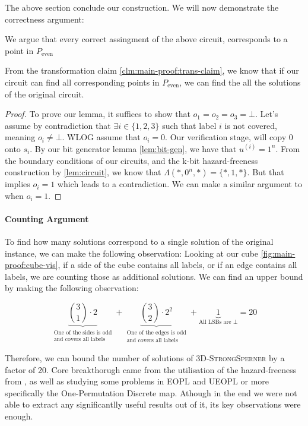The above section conclude our construction. We will now demonstrate the correctness argument:

\begin{lemma}
    We argue that every correct assingment of the above circuit, corresponds to a point in $P_{\text{even}}$
\end{lemma}
From the transformation claim \ref{clm:main-proof:trans-claim}, we know that if our circuit
can find all corresponding points in $P_{\text{even}}$, we can find the all the solutions of the original circuit.

\begin{proof}
    To prove our lemma, it suffices to show that $o_1 = o_2 = o_3 = \bot$. Let's assume by contradiction that
    $\exists i \in \{1,2,3\}$ such that label $i$ is not covered, meaning $o_i \neq \bot$.
    WLOG assume that $o_i = 0$. Our verification stage, will copy $0$ onto $s_i$. By our
    bit generator lemma \ref{lem:bit-gen}, we have that $u^{(i)} = 1^n$. From the boundary
    conditions of our circuits, and the k-bit hazard-freeness construction by
    \ref{lem:circuit}, we know that $\Lambda(*, 0^n, *) = \{*, 1,  *\}$. But that implies
    $o_i = 1$ which leads to a contradiction. We can make a similar argument to when $o_i = 1$.
\end{proof}

\paragraph*{Counting Argument}

To find how many solutions correspond to a single solution of the original instance,
we can make the following observation: Looking at our cube \ref{fig:main-proof:cube-vis},
if a side of the cube contains all labels, or if an edge contains all labels, we are counting
those as additional solutions. We can find an upper bound by making the following observation:

$$
\underbrace{\binom{3}{1} \cdot 2}_{\substack{\text{One of the sides is odd} \\ \text{and covers all labels}}}
+ \underbrace{\binom{3}{2} \cdot 2^2}_{\substack{\text{One of the edges is odd} \\ \text{and covers all labels}}}
+ \underbrace{1}_{\text{All LSBs are } \bot} = 20
$$

Therefore, we can bound the number of solutions of \textsc{3D-StrongSperner} by a factor of 20.
Core breakthorugh came from the utilisation of the hazard-freeness from \cite{ikenmeyerComplexityHazardfreeCircuits2019},
as well as studying some problems in EOPL and UEOPL or more specifically the
One-Permutation Discrete map. Athough in the end we were not able to extract any significantlly
useful results out of it, its key observations were enough.


